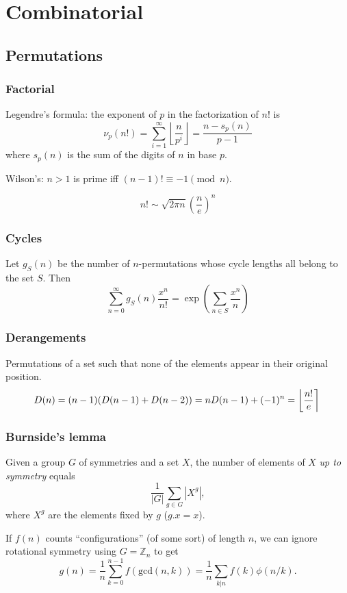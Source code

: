 \chapter{Combinatorial}

\section{Permutations}
	\subsection{Factorial}
		Legendre's formula: the exponent of $p$ in the factorization of $n!$ is
		\[ \nu_{p}(n!) = \sum_{i=1}^{\infty} \left\lfloor \frac{n}{p^i} \right\rfloor = \frac{n - s_{p}(n)}{p-1} \]
		where $s_{p}(n)$ is the sum of the digits of $n$ in base $p$.

		Wilson's: $n>1$ is prime iff $(n-1)! \equiv -1 \pmod{n}$.

		\[ n! \sim \sqrt{2\pi n} \left(\frac{n}{e}\right)^n \]
		

	\subsection{Cycles}
		Let $g_S(n)$ be the number of $n$-permutations whose cycle lengths all belong to the set $S$. Then
		$$\sum_{n=0} ^\infty g_S(n) \frac{x^n}{n!} = \exp\left(\sum_{n\in S} \frac{x^n} {n} \right)$$

	\subsection{Derangements}
		Permutations of a set such that none of the elements appear in their original position.
		\[ \mkern-2mu D(n) = (n-1)(D(n-1)+D(n-2)) = n D(n-1)+(-1)^n = \left\lfloor\frac{n!}{e}\right\rceil \]

	\subsection{Burnside's lemma}
		Given a group $G$ of symmetries and a set $X$, the number of elements of $X$ \emph{up to symmetry} equals
		 \[ {\frac {1}{|G|}}\sum _{{g\in G}}|X^{g}|, \]
		 where $X^{g}$ are the elements fixed by $g$ ($g.x = x$).

		 If $f(n)$ counts ``configurations'' (of some sort) of length $n$, we can ignore rotational symmetry using $G = \mathbb Z_n$ to get
		 \[ g(n) = \frac 1 n \sum_{k=0}^{n-1}{f(\text{gcd}(n, k))} = \frac 1 n \sum_{k|n}{f(k)\phi(n/k)}. \]

